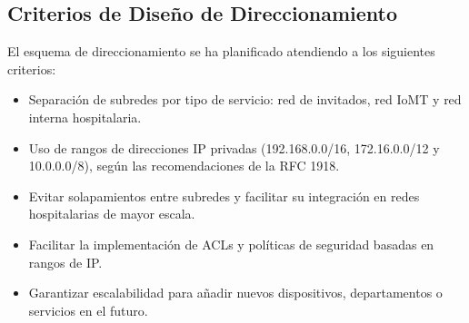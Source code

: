 \subsection{Criterios de Diseño de Direccionamiento}
El esquema de direccionamiento se ha planificado atendiendo a los siguientes criterios:
\begin{itemize}
    \item Separación de subredes por tipo de servicio: red de invitados, red IoMT y red interna hospitalaria.
    \item Uso de rangos de direcciones IP privadas (192.168.0.0/16, 172.16.0.0/12 y 10.0.0.0/8), según las recomendaciones de la \ac{RFC} 1918.
    \item Evitar solapamientos entre subredes y facilitar su integración en redes hospitalarias de mayor escala.
    \item Facilitar la implementación de ACLs y políticas de seguridad basadas en rangos de IP.
    \item Garantizar escalabilidad para añadir nuevos dispositivos, departamentos o servicios en el futuro.
\end{itemize}

